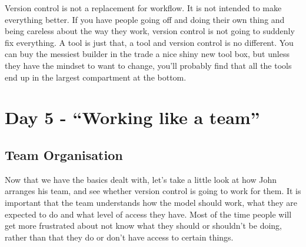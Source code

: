 Version control is not a replacement for workflow.  It is not intended to make everything better.  If you have people going off and doing their own thing and being careless about the way they work, version control is not going to suddenly fix everything.  A tool is just that, a tool and version control is no different.  You can buy the messiest builder in the trade a nice shiny new tool box, but unless they have the mindset to want to change, you'll probably find that all the tools end up in the largest compartment at the bottom.

\section*{Day 5 - ``Working like a team''}

\subsection*{Team Organisation}

Now that we have the basics dealt with, let's take a little look at how John arranges his team, and see whether version control is going to work for them.  It is important that the team understands how the model should work, what they are expected to do and what level of access they have.  Most of the time people will get more frustrated about not know what they should or shouldn't be doing, rather than that they do or don't have access to certain things.

